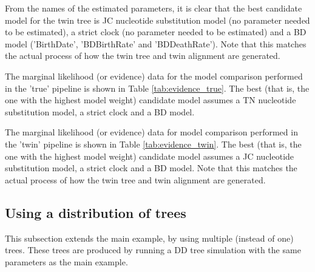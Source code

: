 From the names of the estimated parameters, it is clear that
the best candidate model for the twin tree
is JC nucleotide substitution 
model (no parameter needed to be estimated),
a strict clock (no parameter needed to be estimated) and a BD 
model ('BirthDate', 'BDBirthRate' and 'BDDeathRate').
Note that this matches the actual process of how the twin tree
and twin alignment are generated.



\newpage

The marginal likelihood (or evidence) data for the model comparison
performed in the 'true' pipeline is shown in Table \ref{tab:evidence_true}.
The best (that is, the one with the highest model weight)
candidate model assumes a TN nucleotide substitution model,
a strict clock and a BD model.



\newpage

The marginal likelihood (or evidence) data for model comparison
performed in the 'twin' pipeline is shown in Table \ref{tab:evidence_twin}.
The best (that is, the one with the highest model weight)
candidate model assumes a JC nucleotide substitution model,
a strict clock and a BD model.
Note that this matches the actual process of how the twin tree
and twin alignment are generated.



\newpage

\subsection{Using a distribution of trees}
\label{subsec:distribution}

This subsection extends the main example, by using multiple (instead of
one) trees. These trees are produced by running a DD tree simulation
with the same parameters as the main example.


